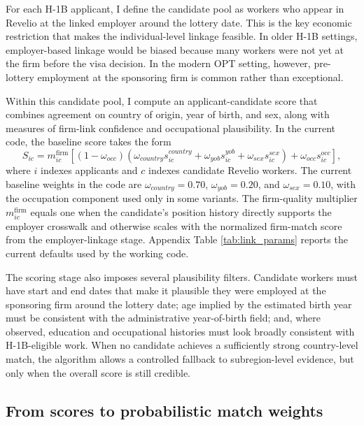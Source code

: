 For each H-1B applicant, I define the candidate pool as workers who appear in Revelio at the linked employer around the lottery date. This is the key economic restriction that makes the individual-level linkage feasible. In older H-1B settings, employer-based linkage would be biased because many workers were not yet at the firm before the visa decision. In the modern OPT setting, however, pre-lottery employment at the sponsoring firm is common rather than exceptional.

Within this candidate pool, I compute an applicant-candidate score that combines agreement on country of origin, year of birth, and sex, along with measures of firm-link confidence and occupational plausibility. In the current code, the baseline score takes the form
\begin{equation}
\label{eq:matchscore}
S_{ic} = m^{\text{firm}}_{ic}\left[(1-\omega_{occ})\left(\omega_{country}s^{country}_{ic} + \omega_{yob}s^{yob}_{ic} + \omega_{sex}s^{sex}_{ic}\right) + \omega_{occ}s^{occ}_{ic}\right],
\end{equation}
where $i$ indexes applicants and $c$ indexes candidate Revelio workers. The current baseline weights in the code are $\omega_{country}=0.70$, $\omega_{yob}=0.20$, and $\omega_{sex}=0.10$, with the occupation component used only in some variants. The firm-quality multiplier $m^{\text{firm}}_{ic}$ equals one when the candidate's position history directly supports the employer crosswalk and otherwise scales with the normalized firm-match score from the employer-linkage stage. Appendix Table \ref{tab:link_params} reports the current defaults used by the working code.

The scoring stage also imposes several plausibility filters. Candidate workers must have start and end dates that make it plausible they were employed at the sponsoring firm around the lottery date; age implied by the estimated birth year must be consistent with the administrative year-of-birth field; and, where observed, education and occupational histories must look broadly consistent with H-1B-eligible work. When no candidate achieves a sufficiently strong country-level match, the algorithm allows a controlled fallback to subregion-level evidence, but only when the overall score is still credible.

\subsection{From scores to probabilistic match weights}

